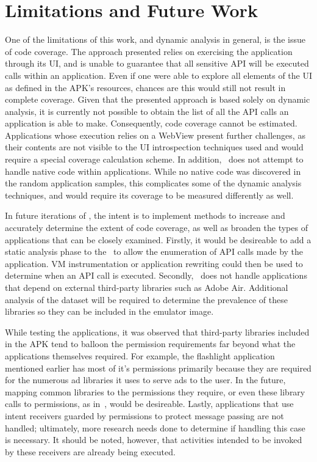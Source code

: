 \chapter{Limitations and Future Work}
\label{sec:future}

One of the limitations of this work, and dynamic analysis in general, is the issue of code coverage.  The approach presented relies on exercising the application through its UI, and is unable to guarantee that all sensitive API will be executed calls within an application. Even if one were able to explore all elements of the UI as defined in the APK's resources, chances are this would still not result in complete coverage.  Given that the presented approach is based solely on dynamic analysis, it is currently not possible to obtain the list of all the API calls an application is able to make. Consequently, code coverage cannot be estimated.  Applications whose execution relies on a WebView present further challenges, as their contents are not visible to the UI introspection techniques used and would require a special coverage calculation scheme.  In addition, \toolname~does not attempt to handle native code within applications.  While no native code was discovered in the random application samples, this complicates some of the dynamic analysis techniques, and would require its coverage to be measured differently as well.

In future iterations of \toolname, the intent is to implement methods to increase and accurately determine the extent of code coverage, as well as broaden the types of applications that can be closely examined.  Firstly, it would be desireable to add a static analysis phase to the \toolname~to allow the enumeration of API calls made by the application.  VM instrumentation or application rewriting could then be used to determine when an API call is executed.  Secondly, \toolname~does not handle applications that depend on external third-party libraries such as Adobe Air.  Additional analysis of the dataset will be required to determine the prevalence of these libraries so they can be included in the emulator image.  

While testing the applications, it was observed that third-party libraries included in the APK tend to balloon the permission requirements far beyond what the applications themselves required. For example, the flashlight application mentioned earlier has most of it's permissions primarily because they are required for the numerous ad libraries it uses to serve ads to the user. In the future, mapping common libraries to the permissions they require, or even these library calls to permissions, as in~\cite{Felt}, would be desireable. Lastly, applications that use intent receivers guarded by permissions to protect message passing are not handled; ultimately, more research needs done to determine if handling this case is necessary.  It should be noted, however, that activities intended to be invoked by these receivers are already being executed.

